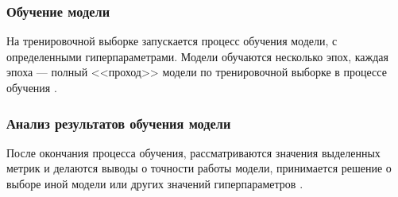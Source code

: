 \subsubsection{Обучение модели}
На тренировочной выборке запускается процесс обучения модели, с определенными гиперпараметрами. Модели обучаются несколько эпох, каждая эпоха --- полный 
<<проход>> модели по тренировочной выборке в процессе обучения \cite{epoch}.

\subsubsection{Анализ результатов обучения модели}
После окончания процесса обучения, рассматриваются значения  выделенных метрик и делаются выводы  о точности работы модели, принимается
решение о выборе иной модели или других значений гиперпараметров \cite{learning}.












